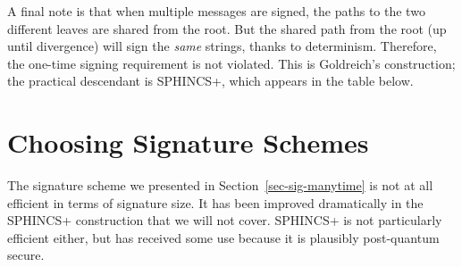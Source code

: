 \documentclass[
  letterpaper,
]{scrbook}
\theoremstyle{definition}
\theoremstyle{plain}
\theoremstyle{plain}
\theoremstyle{remark}
\begin{document}
A final note is that when multiple messages are signed, the paths to the
two different leaves are shared from the root. But the shared path from
the root (up until divergence) will sign the \emph{same} strings, thanks
to determinism. Therefore, the one-time signing requirement is not
violated. This is Goldreich's construction; the practical descendant is
SPHINCS+, which appears in the table below.

\section{Choosing Signature Schemes}\label{choosing-signature-schemes}

The signature scheme we presented in Section~\ref{sec-sig-manytime} is
not at all efficient in terms of signature size. It has been improved
dramatically in the SPHINCS+ construction that we will not cover.
SPHINCS+ is not particularly efficient either, but has received some use
because it is plausibly post-quantum secure.
\end{document}
